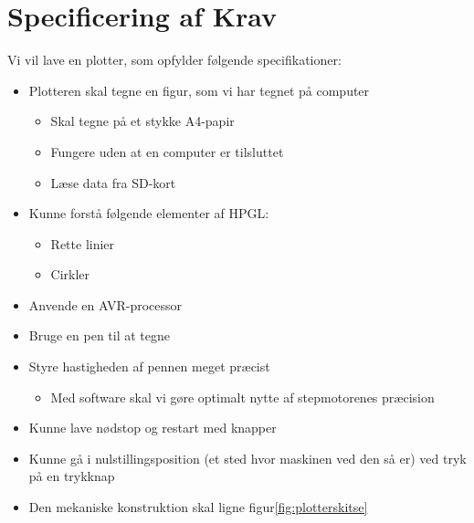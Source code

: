 \section{Specificering af Krav}
\label{sc:specificering af krav}

Vi vil lave en plotter, som opfylder følgende specifikationer:

\begin{itemize}
\item Plotteren skal tegne en figur, som vi har tegnet på computer
  \begin{itemize}
  \item Skal tegne på et stykke A4-papir
  \item Fungere uden at en computer er tilsluttet
  \item Læse data fra SD-kort
  \end{itemize}
\item Kunne forstå følgende elementer af HPGL:
  \begin{itemize}
  \item Rette linier
  \item Cirkler
  \end{itemize}
\item Anvende en AVR-processor
\item Bruge en pen til at tegne
\item Styre hastigheden af pennen meget præcist
  \begin{itemize}
  \item Med software skal vi gøre optimalt nytte af stepmotorenes præcision
  \end{itemize}
\item Kunne lave nødstop og restart med knapper
\item Kunne gå i nulstillingsposition (et sted hvor maskinen ved den
  så er) ved tryk på en trykknap
\item Den mekaniske konstruktion skal ligne figur\vref{fig:plotterskitse}
\end{itemize}
